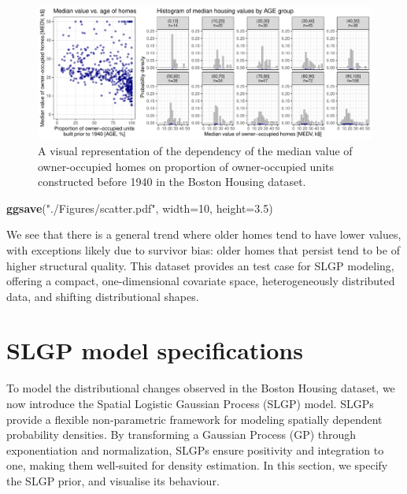 \documentclass[
]{article}
\newenvironment{Shaded}{\begin{snugshade}}{\end{snugshade}}
\newcommand{\AttributeTok}[1]{\textcolor[rgb]{0.13,0.29,0.53}{#1}}
\newcommand{\DecValTok}[1]{\textcolor[rgb]{0.00,0.00,0.81}{#1}}
\newcommand{\FloatTok}[1]{\textcolor[rgb]{0.00,0.00,0.81}{#1}}
\newcommand{\FunctionTok}[1]{\textcolor[rgb]{0.13,0.29,0.53}{\textbf{#1}}}
\newcommand{\NormalTok}[1]{#1}
\newcommand{\StringTok}[1]{\textcolor[rgb]{0.31,0.60,0.02}{#1}}
\begin{document}
\begin{figure}[H]

{\centering \includegraphics{IntroductionSLGP_files/figure-latex/figureHousing-1} 

}

\caption{A visual representation of the dependency of the median value of owner-occupied homes on proportion of owner-occupied units constructed before 1940 in the Boston Housing dataset.}\label{fig:figureHousing}
\end{figure}

\begin{Shaded}
\begin{Highlighting}[]
\FunctionTok{ggsave}\NormalTok{(}\StringTok{"./Figures/scatter.pdf"}\NormalTok{, }\AttributeTok{width=}\DecValTok{10}\NormalTok{, }\AttributeTok{height=}\FloatTok{3.5}\NormalTok{)}
\end{Highlighting}
\end{Shaded}

We see that there is a general trend where older homes tend to have lower values, with exceptions likely due to survivor bias: older homes that persist tend to be of higher structural quality. This dataset provides an test case for SLGP modeling, offering a compact, one-dimensional covariate space, heterogeneously distributed data, and shifting distributional shapes.

\section{SLGP model specifications}\label{slgp-model-specifications}

To model the distributional changes observed in the Boston Housing dataset, we now introduce the Spatial Logistic Gaussian Process (SLGP) model. SLGPs provide a flexible non-parametric framework for modeling spatially dependent probability densities. By transforming a Gaussian Process (GP) through exponentiation and normalization, SLGPs ensure positivity and integration to one, making them well-suited for density estimation.
In this section, we specify the SLGP prior, and visualise its behaviour.
\end{document}
